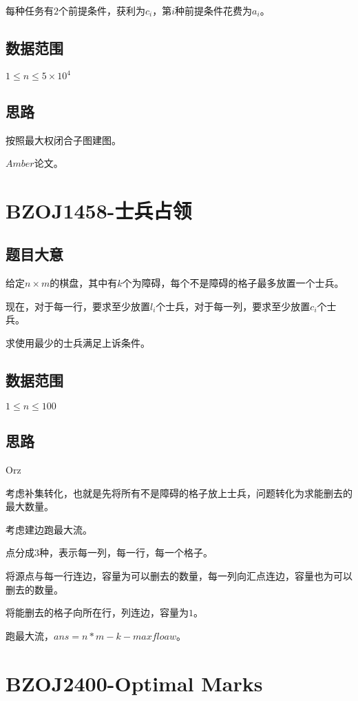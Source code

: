 \documentclass{ctexart}
\numberwithin{equation}{section}
\begin{document}
\begin{flushleft}
  每种任务有$2$个前提条件，获利为$c_i$，第$i$种前提条件花费为$a_i$。
  
  \subsection{数据范围}
  $1\le n \le 5\times 10^4$
  \subsection{思路}
  按照最大权闭合子图建图。

  $Amber$论文。

  \newpage

  \section{BZOJ1458-士兵占领}
  \subsection{题目大意}
  给定$n\times m$的棋盘，其中有$k$个为障碍，每个不是障碍的格子最多放置一个士兵。

  现在，对于每一行，要求至少放置$l_i$个士兵，对于每一列，要求至少放置$c_i$个士兵。

  求使用最少的士兵满足上诉条件。
  
  \subsection{数据范围}
  $1\le n \le 100$
  \subsection{思路}
  Orz

  考虑补集转化，也就是先将所有不是障碍的格子放上士兵，问题转化为求能删去的最大数量。

  考虑建边跑最大流。

  点分成$3$种，表示每一列，每一行，每一个格子。

  将源点与每一行连边，容量为可以删去的数量，每一列向汇点连边，容量也为可以删去的数量。

  将能删去的格子向所在行，列连边，容量为$1$。

  跑最大流，$ans=n*m-k-maxfloaw$。

  \newpage

  \section{BZOJ2400-Optimal Marks}

\end{flushleft}
\end{document}
